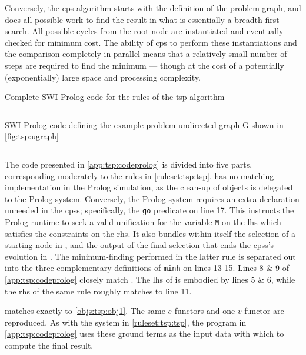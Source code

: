 Conversely, the \gls{cps} algorithm starts with the definition of the problem graph, and does all possible work to find the result in what is essentially a breadth-first search.  All possible cycles from the root node are instantiated and eventually checked for minimum cost. The ability of \gls{cps} to perform these instantiations and the comparison completely in parallel means that a relatively small number of steps are required to find the minimum --- though at the cost of a potentially (exponentially) large space and processing complexity.

\begin{listing}
\caption[Complete SWI-Prolog code for the  algorithm]{\label{app:tsp:codeprolog}Complete SWI-Prolog code for the rules of the \gls{tsp} algorithm}
\inputminted[linenos,breaklines,frame=lines,autogobble,firstline=5]{prolog}{chapters/tsp/code/tsp.pl.txt}
\end{listing}

\begin{listing}
\caption{\label{app:tsp:probprolog}SWI-Prolog code defining the example problem undirected graph G shown in \cref{fig:tsp:ugraph}}
\inputminted[linenos,breaklines,frame=lines,autogobble,lastline=3]{prolog}{chapters/tsp/code/tsp.pl.txt}
\end{listing}

The code presented in \cref{app:tsp:codeprolog} is divided into five parts, corresponding moderately to the rules in \cref{ruleset:tsp:tsp}.   has no matching implementation in the Prolog simulation, as the clean-up of objects is delegated to the Prolog system.  Conversely, the Prolog system requires an extra declaration unneeded in the \glspl{cps}; specifically, the \texttt{go} predicate on line 17.  This instructs the Prolog runtime to seek a valid unification for the variable \texttt{M} on the \gls{lhs} which satisfies the constraints on the \gls{rhs}.  It also bundles within itself the selection of a starting node in , and the output of the final selection that ends the \glspl{cps}'s evolution in .  The minimum-finding performed in the latter rule is separated out into the three complementary definitions of \texttt{minh} on lines 13-15.  Lines 8 \& 9 of \cref{app:tsp:codeprolog} closely match .  The \gls{lhs} of  is embodied by lines 5 \& 6, while the \gls{rhs} of the same rule roughly matches to line 11.



 matches exactly to \cref{objs:tsp:obj1}.  The same \(e\) functors and one \(v\) functor are reproduced.  As with the system in \cref{ruleset:tsp:tsp}, the program in \cref{app:tsp:codeprolog} uses these ground terms as the input data with which to compute the final result.